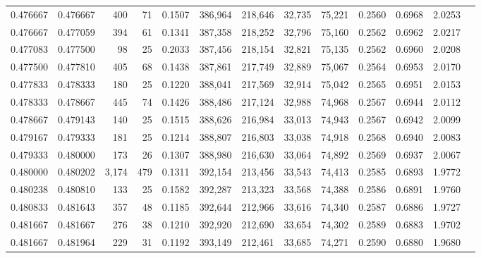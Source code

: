 \begin{tabular}{rrrrrrrrrrrrr}
0.476667 & 0.476667 &   400 &  71 &                                     0.1507 & 386,964 & 218,646 &  32,735 &  75,221 & 0.2560 & 0.6968 & 2.0253 \\
0.476667 & 0.477059 &   394 &  61 &                                     0.1341 & 387,358 & 218,252 &  32,796 &  75,160 & 0.2562 & 0.6962 & 2.0217 \\
0.477083 & 0.477500 &    98 &  25 &                                     0.2033 & 387,456 & 218,154 &  32,821 &  75,135 & 0.2562 & 0.6960 & 2.0208 \\
0.477500 & 0.477810 &   405 &  68 &                                     0.1438 & 387,861 & 217,749 &  32,889 &  75,067 & 0.2564 & 0.6953 & 2.0170 \\
0.477833 & 0.478333 &   180 &  25 &                                     0.1220 & 388,041 & 217,569 &  32,914 &  75,042 & 0.2565 & 0.6951 & 2.0153 \\
0.478333 & 0.478667 &   445 &  74 &                                     0.1426 & 388,486 & 217,124 &  32,988 &  74,968 & 0.2567 & 0.6944 & 2.0112 \\
0.478667 & 0.479143 &   140 &  25 &                                     0.1515 & 388,626 & 216,984 &  33,013 &  74,943 & 0.2567 & 0.6942 & 2.0099 \\
0.479167 & 0.479333 &   181 &  25 &                                     0.1214 & 388,807 & 216,803 &  33,038 &  74,918 & 0.2568 & 0.6940 & 2.0083 \\
0.479333 & 0.480000 &   173 &  26 &                                     0.1307 & 388,980 & 216,630 &  33,064 &  74,892 & 0.2569 & 0.6937 & 2.0067 \\
0.480000 & 0.480202 & 3,174 & 479 &                                     0.1311 & 392,154 & 213,456 &  33,543 &  74,413 & 0.2585 & 0.6893 & 1.9772 \\
0.480238 & 0.480810 &   133 &  25 &                                     0.1582 & 392,287 & 213,323 &  33,568 &  74,388 & 0.2586 & 0.6891 & 1.9760 \\
0.480833 & 0.481643 &   357 &  48 &                                     0.1185 & 392,644 & 212,966 &  33,616 &  74,340 & 0.2587 & 0.6886 & 1.9727 \\
0.481667 & 0.481667 &   276 &  38 &                                     0.1210 & 392,920 & 212,690 &  33,654 &  74,302 & 0.2589 & 0.6883 & 1.9702 \\
0.481667 & 0.481964 &   229 &  31 &                                     0.1192 & 393,149 & 212,461 &  33,685 &  74,271 & 0.2590 & 0.6880 & 1.9680 \\

\end{tabular}
